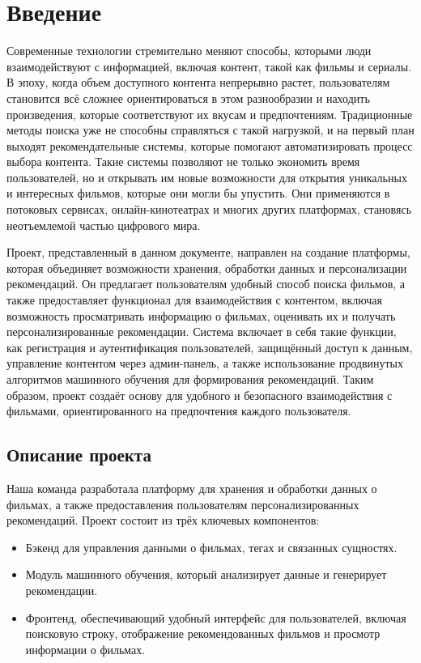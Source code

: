 \chapter*{Введение}
\label{ch:intro}

Современные технологии стремительно меняют способы, которыми люди взаимодействуют с информацией, включая контент, такой как фильмы и сериалы. В эпоху, когда объем доступного контента непрерывно растет, пользователям становится всё сложнее ориентироваться в этом разнообразии и находить произведения, которые соответствуют их вкусам и предпочтениям. Традиционные методы поиска уже не способны справляться с такой нагрузкой, и на первый план выходят рекомендательные системы, которые помогают автоматизировать процесс выбора контента. Такие системы позволяют не только экономить время пользователей, но и открывать им новые возможности для открытия уникальных и интересных фильмов, которые они могли бы упустить. Они применяются в потоковых сервисах, онлайн-кинотеатрах и многих других платформах, становясь неотъемлемой частью цифрового мира.

Проект, представленный в данном документе, направлен на создание платформы, которая объединяет возможности хранения, обработки данных и персонализации рекомендаций. Он предлагает пользователям удобный способ поиска фильмов, а также предоставляет функционал для взаимодействия с контентом, включая возможность просматривать информацию о фильмах, оценивать их и получать персонализированные рекомендации. Система включает в себя такие функции, как регистрация и аутентификация пользователей, защищённый доступ к данным, управление контентом через админ-панель, а также использование продвинутых алгоритмов машинного обучения для формирования рекомендаций. Таким образом, проект создаёт основу для удобного и безопасного взаимодействия с фильмами, ориентированного на предпочтения каждого пользователя.

\section*{Описание проекта}

Наша команда разработала платформу для хранения и обработки данных о фильмах, а также предоставления пользователям персонализированных рекомендаций. Проект состоит из трёх ключевых компонентов:

\begin{itemize}
    \item Бэкенд для управления данными о фильмах, тегах и связанных сущностях.
    \item Модуль машинного обучения, который анализирует данные и генерирует рекомендации.
    \item Фронтенд, обеспечивающий удобный интерфейс для пользователей, включая поисковую строку, отображение рекомендованных фильмов и просмотр информации о фильмах.
\end{itemize}

